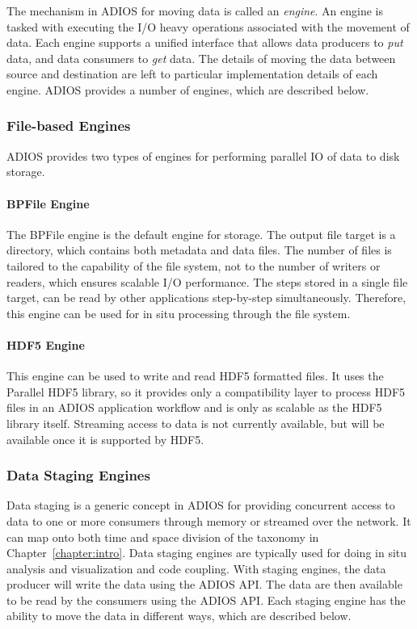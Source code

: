 \documentclass[x11names,table,xcdraw,graybox]{svmult}
\begin{document}
The mechanism in ADIOS for moving data is called an \emph{engine}.
An engine is tasked with executing the I/O heavy operations associated with the movement of data.
Each engine supports a unified interface that allows data producers to \emph{put} data, and data consumers to \emph{get} data. The details of moving the data between source and destination are left to particular implementation details of each engine.
ADIOS provides a number of engines, which are described below.

\subsubsection{File-based Engines}
ADIOS provides two types of engines for performing parallel IO of data to disk storage.

\paragraph{\textbf{BPFile Engine}}
The BPFile engine is the default engine for storage.
The output file target is a directory, which contains both metadata and  data files. The number of files is tailored to the capability of the file system, not to the number of writers or readers, which ensures scalable I/O performance. The steps stored in a single file target, can be read by other applications step-by-step simultaneously. Therefore, this engine can be used for in situ processing through the file system.

\paragraph{\textbf{HDF5 Engine}}
This engine can be used to write and read HDF5 formatted files. It uses the Parallel HDF5 library, so it provides only a compatibility layer to process HDF5 files in an ADIOS application workflow and is only as scalable as the HDF5 library itself. Streaming access to data is not currently available, but will be available once it is supported by HDF5.

\subsubsection{Data Staging Engines}
Data staging is a generic concept in ADIOS for providing concurrent access to data to one or more consumers through memory or streamed over the network. It can map onto both time and space division of the taxonomy in Chapter~\ref{chapter:intro}. Data staging engines are typically used for doing in situ analysis and visualization and code coupling. With staging engines, the data producer will write the data using the ADIOS API. The data are then available to be read by the consumers using the ADIOS API. Each staging engine has the ability to move the data in different ways, which are described below.
\end{document}
